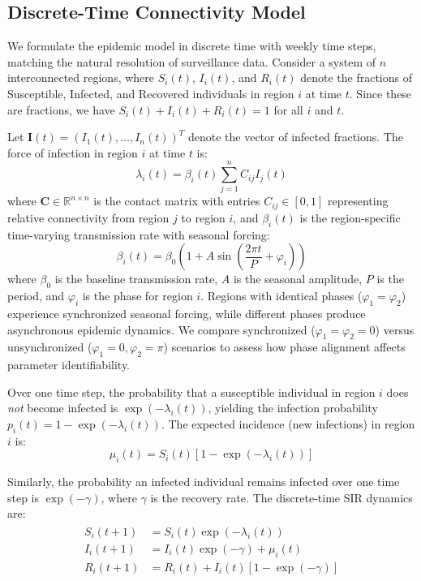 \subsection*{Discrete-Time Connectivity Model}

We formulate the epidemic model in discrete time with weekly time steps,
matching the natural resolution of surveillance data. Consider a system
of $n$ interconnected regions, where $S_i(t)$, $I_i(t)$, and $R_i(t)$
denote the fractions of Susceptible, Infected, and Recovered individuals
in region $i$ at time $t$. Since these are fractions, we have
$S_i(t) + I_i(t) + R_i(t) = 1$ for all $i$ and $t$.

Let $\mathbf{I}(t) = (I_1(t), \ldots, I_n(t))^T$ denote the vector of
infected fractions. The force of infection in region $i$ at time $t$ is:
\begin{equation*}
\lambda_i(t) = \beta_i(t) \sum_{j=1}^n C_{ij} I_j(t)
\end{equation*}
where $\mathbf{C} \in \mathbb{R}^{n \times n}$ is the contact matrix with
entries $C_{ij} \in [0,1]$ representing relative connectivity from
region $j$ to region $i$, and $\beta_i(t)$ is the region-specific
time-varying transmission rate with seasonal forcing:
\begin{equation*}
\beta_i(t) = \beta_0\left(1 + A\sin\left(\frac{2\pi t}{P} + \varphi_i\right)\right)
\end{equation*}
where $\beta_0$ is the baseline transmission rate, $A$ is the seasonal
amplitude, $P$ is the period, and $\varphi_i$ is the phase for region
$i$. Regions with identical phases ($\varphi_1 = \varphi_2$) experience
synchronized seasonal forcing, while different phases produce
asynchronous epidemic dynamics. We compare synchronized
($\varphi_1 = \varphi_2 = 0$) versus unsynchronized
($\varphi_1 = 0, \varphi_2 = \pi$) scenarios to assess how phase
alignment affects parameter identifiability.

Over one time step, the probability that a susceptible individual in
region $i$ does \emph{not} become infected is $\exp(-\lambda_i(t))$,
yielding the infection probability $p_i(t) = 1 - \exp(-\lambda_i(t))$.
The expected incidence (new infections) in region $i$ is:
\begin{equation}\label{eq:incidence}
\mu_i(t) = S_i(t) \left[1 - \exp(-\lambda_i(t))\right]
\end{equation}

Similarly, the probability an infected individual remains infected over
one time step is $\exp(-\gamma)$, where $\gamma$ is the recovery rate.
The discrete-time SIR dynamics are:
\begin{align}\begin{split}\label{eq:discrete_sir}
S_i(t+1) &= S_i(t) \exp(-\lambda_i(t)) \\
I_i(t+1) &= I_i(t) \exp(-\gamma) + \mu_i(t) \\
R_i(t+1) &= R_i(t) + I_i(t) [1 - \exp(-\gamma)]
\end{split}\end{align}

